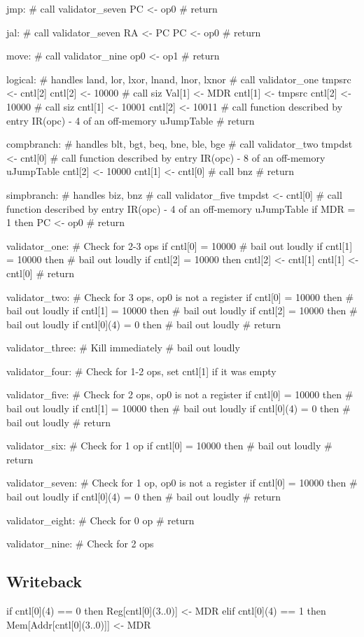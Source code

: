 \documentclass[12pt]{article}
\begin{document}
\begin{verbatimtab}
jmp:
    # call validator_seven
    PC <- op0
    # return

jal:
    # call validator_seven
    RA <- PC    
    PC <- op0
    # return

move:
    # call validator_nine
    op0 <- op1
    # return

logical: # handles land, lor, lxor, lnand, lnor, lxnor
	# call validator_one
	tmpsrc <- cntl[2]
	cntl[2] <- 10000
	# call siz
	Val[1] <- MDR
	cntl[1] <- tmpsrc
	cntl[2] <- 10000
	# call siz
	cntl[1] <- 10001
	cntl[2] <- 10011
	# call function described by entry IR(opc) - 4 of an off-memory uJumpTable
	# return

compbranch: # handles blt, bgt, beq, bne, ble, bge
	# call validator_two
	tmpdst <- cntl[0]
	# call function described by entry IR(opc) - 8 of an off-memory uJumpTable
	cntl[2] <- 10000
	cntl[1] <- cntl[0]
	# call bnz
	# return

simpbranch: # handles biz, bnz
	# call validator_five
	tmpdst <- cntl[0]
	# call function described by entry IR(opc) - 4 of an off-memory uJumpTable
	if MDR = 1 then
		PC <- op0
	# return

validator_one:
	# Check for 2-3 ops
	if cntl[0] = 10000
		# bail out loudly
	if cntl[1] = 10000 then
		# bail out loudly
	if cntl[2] = 10000 then
		cntl[2] <- cntl[1]
		cntl[1] <- cntl[0]
	# return

validator_two:
	# Check for 3 ops, op0 is not a register
	if cntl[0] = 10000 then
		# bail out loudly
	if cntl[1] = 10000 then
		# bail out loudly
	if cntl[2] = 10000 then
		# bail out loudly
	if cntl[0](4) = 0 then
		# bail out loudly
	# return

validator_three:
	# Kill immediately
	# bail out loudly

validator_four:
	# Check for 1-2 ops, set cntl[1] if it was empty

validator_five:
	# Check for 2 ops, op0 is not a register
	if cntl[0] = 10000 then
		# bail out loudly
	if cntl[1] = 10000 then
		# bail out loudly
	if cntl[0](4) = 0 then
		# bail out loudly
	# return

validator_six:
	# Check for 1 op
	if cntl[0] = 10000 then
		# bail out loudly
	# return

validator_seven:
	# Check for 1 op, op0 is not a register
	if cntl[0] = 10000 then
		# bail out loudly
	if cntl[0](4) = 0 then
		# bail out loudly
	# return

validator_eight:
	# Check for 0 op
	# return

validator_nine:
	# Check for 2 ops
\end{verbatimtab}

\subsection{Writeback}
\begin{verbatimtab}
if cntl[0](4) == 0 then
   Reg[cntl[0](3..0)] <- MDR
elif cntl[0](4) == 1 then
   Mem[Addr[cntl[0](3..0)]] <- MDR
\end{verbatimtab}
\end{document}

